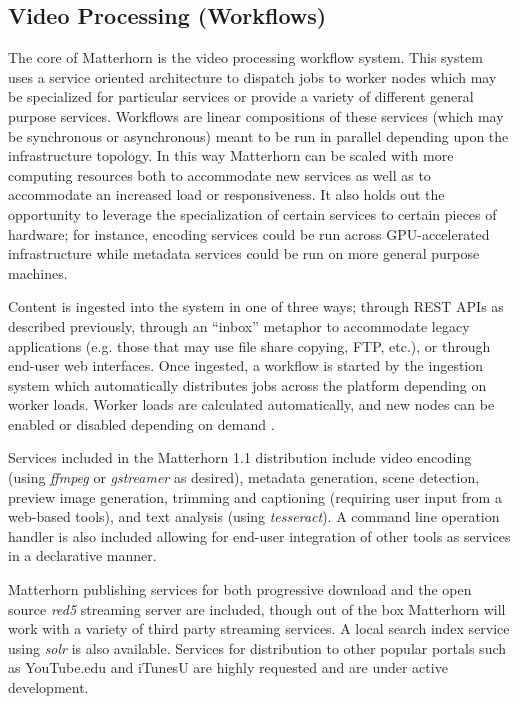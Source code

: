 \documentclass{sig-alternate}
\begin{document}
\subsection{Video Processing (Workflows)}
The core of Matterhorn is the video processing workflow system.  This system uses a service oriented architecture to dispatch jobs to worker nodes which may be specialized for particular services or provide a variety of different general purpose services.  Workflows are linear compositions of these services (which may be synchronous or asynchronous) meant to be run in parallel depending upon the infrastructure topology.  In this way Matterhorn can be scaled with more computing resources both to accommodate new services as well as to accommodate an increased load or responsiveness.  It also holds out the opportunity to leverage the specialization of certain services to certain pieces of hardware; for instance, encoding services could be run across GPU-accelerated infrastructure while metadata services could be run on more general purpose machines.

Content is ingested into the system in one of three ways; through REST APIs as described previously, through an ``inbox'' metaphor to accommodate legacy applications (e.g. those that may use file share copying, FTP, etc.), or through end-user web interfaces.  Once ingested, a workflow is started by the ingestion system which automatically distributes jobs across the platform depending on worker loads.  Worker loads are calculated automatically, and new nodes can be enabled or disabled depending on demand .

Services included in the Matterhorn 1.1 distribution include video encoding (using \emph{ffmpeg} or \emph{gstreamer} as desired), metadata generation, scene detection, preview image generation, trimming and captioning (requiring user input from a web-based tools), and text analysis (using \emph{tesseract}).  A command line operation handler is also included allowing for end-user integration of other tools as services in a declarative manner.

Matterhorn publishing services for both progressive download and the open source \emph{red5} streaming server are included, though out of the box Matterhorn will work with a variety of third party streaming services.  A local search index service using \emph{solr} is also available.  Services for distribution to other popular portals such as YouTube.edu and iTunesU are highly requested and are under active development.
\end{document}
